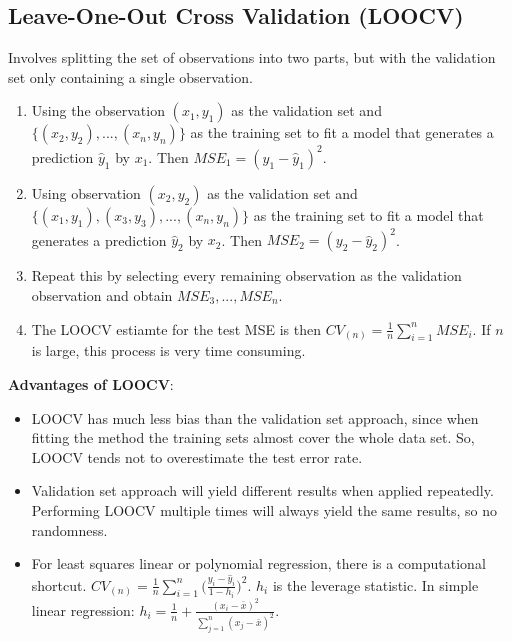 \documentclass[11pt]{article}
\begin{document}
\subsection{Leave-One-Out Cross Validation (LOOCV)}
\noindent Involves splitting the set of observations into two parts, but with the validation set only containing a single observation. \\

\begin{enumerate}
    \item Using the observation $(x_1, y_1)$ as the validation set and $\{ (x_2,y_2),...,(x_n,y_n) \}$ as the training set to fit a model that generates a prediction $\hat y_1$ by $x_1$. Then $MSE_1 = (y_1 - \hat y_1)^2$.
    \item Using observation $(x_2,y_2)$ as the validation set and $\{ (x_1,y_1),(x_3,y_3),...,(x_n,y_n) \}$ as the training set to fit a model that generates a prediction $\hat y_2$ by $x_2$. Then $MSE_2 = (y_2 - \hat y_2)^2$.
    \item Repeat this by selecting every remaining observation as the validation observation and obtain $MSE_3,...,MSE_n$.
    \item The LOOCV estiamte for the test MSE is then $CV_{(n)} = \frac{1}{n}\sum_{i=1}^{n}{MSE_i}$. If $n$ is large, this process is very time consuming.
\end{enumerate} \phantom{i}

\noindent \textbf{Advantages of LOOCV}:
\begin{itemize}
    \item LOOCV has much less bias than the validation set approach, since when fitting the method the training sets almost cover the whole data set. So, LOOCV tends not to overestimate the test error rate.
    \item Validation set approach will yield different results when applied repeatedly. Performing LOOCV multiple times will always yield the same results, so no randomness.
    \item For least squares linear or polynomial regression, there is a computational shortcut. $CV_{(n)} = \frac{1}{n}\sum_{i=1}^{n}\Big( \frac{y_i - \hat y_i}{1 - h_i} \Big)^2$. $h_i$ is the leverage statistic. In simple linear regression: $h_i = \frac{1}{n} + \frac{(x_i - \bar x)^2}{\sum_{j=1}^{n}{(x_j - \bar x)^2}}$.
\end{itemize}
\end{document}
